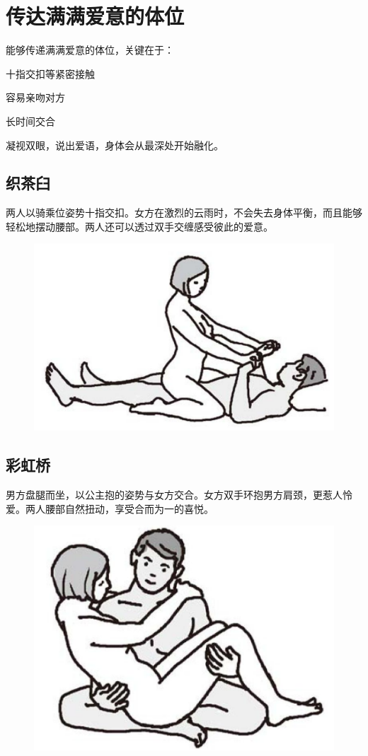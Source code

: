 \documentclass[12pt,UTF8]{ctexbook}
\begin{document}
\section{传达满满爱意的体位}

能够传递满满爱意的体位，关键在于：

十指交扣等紧密接触

容易亲吻对方

长时间交合

凝视双眼，说出爱语，身体会从最深处开始融化。

\subsection{织茶臼}

两人以骑乘位姿势十指交扣。女方在激烈的云雨时，不会失去身体平衡，而且能够轻松地摆动腰部。两人还可以透过双手交缠感受彼此的爱意。

\begin{figure}[htbp]
	\centering
	\includegraphics[width=0.7\linewidth]{tw13}
	\caption{}
	\label{fig:1}
\end{figure}

\subsection{彩虹桥}

男方盘腿而坐，以公主抱的姿势与女方交合。女方双手环抱男方肩颈，更惹人怜爱。两人腰部自然扭动，享受合而为一的喜悦。

\begin{figure}[htbp]
	\centering
	\includegraphics[width=0.7\linewidth]{tw14}
	\caption{}
	\label{fig:1}
\end{figure}
\end{document}

